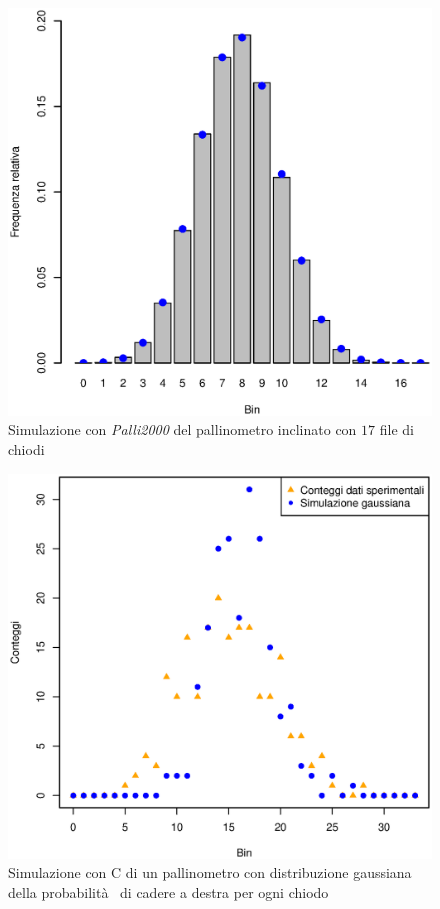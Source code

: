 \documentclass[10pt,oneside,a4paper]{article}
\begin{document}
\begin{figure}[H]
\caption{Simulazione con \emph{Palli2000} del pallinometro inclinato con $17$ file di chiodi}
\label{fig:palli2000_inclinato_17}
\centering
\includegraphics[scale=0.5]{palli200_inclinato_3.eps}
\end{figure}

\begin{figure}[H]
\caption{Simulazione con C di un pallinometro con distribuzione gaussiana della probabilità  di cadere a destra per ogni chiodo}
\label{}
\centering
\includegraphics[scale=0.5]{lollo.eps}
\end{figure}
\end{document}
